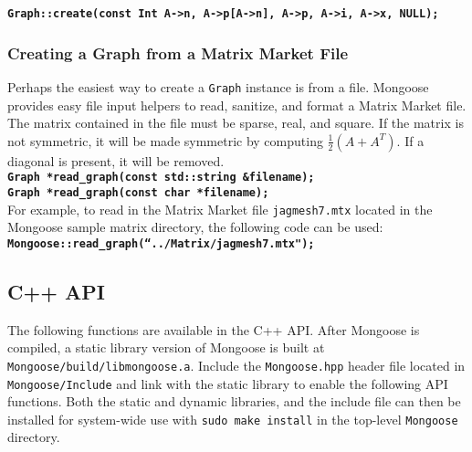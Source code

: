 \documentclass[letter]{article}
\begin{document}
\textbf{\texttt{Graph::create(const Int A->n, A->p[A->n], A->p, A->i, A->x, NULL);}}

\subsubsection{Creating a Graph from a Matrix Market File}

Perhaps the easiest way to create a \texttt{Graph} instance is from a file. Mongoose provides easy file input helpers to read, sanitize, and format a Matrix Market file. The matrix contained in the file must be sparse, real, and square. If the matrix is not symmetric, it will be made symmetric by computing $\frac{1}{2}(A+A^T)$. If a diagonal is present, it will be removed.\\

\textbf{\texttt{Graph *read\_graph(const std::string \&filename);}}\\
\textbf{\texttt{Graph *read\_graph(const char *filename);}}\\

For example, to read in the Matrix Market file \texttt{jagmesh7.mtx} located in the Mongoose sample matrix directory, the following code can be used:\\

\textbf{\texttt{Mongoose::read\_graph(``../Matrix/jagmesh7.mtx");}}

\subsection{C++ API}

The following functions are available in the C++ API. After Mongoose is compiled, a static library version of Mongoose is built at \texttt{Mongoose/build/libmongoose.a}. Include the \texttt{Mongoose.hpp} header file located in \texttt{Mongoose/Include} and link with the static library to enable the following API functions.
Both the static and dynamic libraries, and the include file can then be
installed for system-wide use with \texttt{sudo make install} in the top-level
\texttt{Mongoose} directory.
\end{document}
